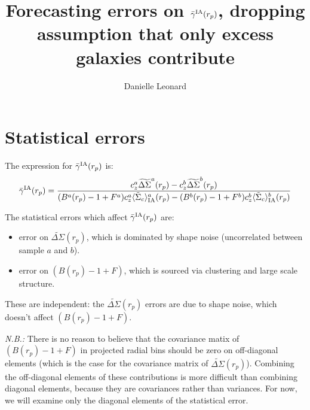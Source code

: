 \documentclass[onecolumn,amsmath,aps,fleqn, superscriptaddress]{revtex4}
\begin{document}
\title{Forecasting errors on $\bar{\gamma}^{\rm IA}(r_p)$, dropping assumption that only excess galaxies contribute}

\author{Danielle Leonard}

\maketitle

\section{Statistical errors}

The expression for $\bar{\gamma}^{\rm IA}(r_p)$ is:
\begin{equation}
\bar{\gamma}^{\rm IA}(r_p) = \frac{c_z^a \widetilde{\Delta\Sigma}^a(r_p) - c_z^b \widetilde{\Delta\Sigma}^b(r_p)}{(B^a(r_p)-1+F^a)c_z^a \langle \tilde{\Sigma}_c\rangle_{\rm IA}^a(r_p) -(B^b(r_p)-1+F^b)c_z^b \langle \tilde{\Sigma}_c\rangle_{\rm IA}^b(r_p)}
\label{gamma_sol_oct26}
\end{equation}

The statistical errors which affect $\bar{\gamma}^{\rm IA}(r_p)$ are:
\begin{itemize}
\item{error on $\widetilde{\Delta\Sigma}(r_p)$, which is dominated by shape noise (uncorrelated between sample $a$ and $b$).}
\item{error on $(B(r_p)-1+F)$, which is sourced via clustering and large scale structure.}
\end{itemize}
These are independent: the $\widetilde{\Delta\Sigma}(r_p)$ errors are due to shape noise, which doesn't affect $(B(r_p)-1+F)$.

{\it N.B.:} There is no reason to believe that the covariance matix of $(B(r_p)-1+F)$ in projected radial bins should be zero on off-diagonal elements (which is the case for the covariance matrix of $\widetilde{\Delta\Sigma}(r_p)$). Combining the off-diagonal elements of these contributions is more difficult than combining diagonal elements, because they are covariances rather than variances. For now, we will examine only the diagonal elements of the statistical error. 
\end{document}
